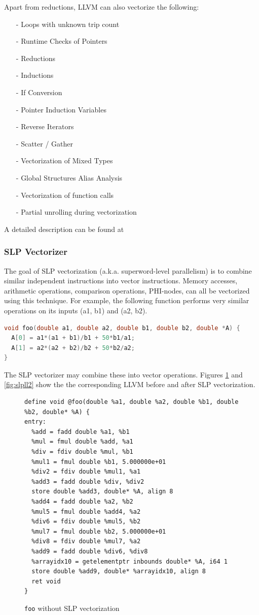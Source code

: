 \documentclass[a4paper,bibliography=totocnumbered,parskip,headsepline]{scrbook}
\begin{document}
Apart from reductions, LLVM can also vectorize the following:
\begin{itemize}[noitemsep]
 \item[-] Loops with unknown trip count
 \item[-] Runtime Checks of Pointers
 \item[-] Reductions
 \item[-] Inductions
 \item[-] If Conversion
 \item[-] Pointer Induction Variables
 \item[-] Reverse Iterators
 \item[-] Scatter / Gather
 \item[-] Vectorization of Mixed Types
 \item[-] Global Structures Alias Analysis
 \item[-] Vectorization of function calls
 \item[-] Partial unrolling during vectorization
\end{itemize}
A detailed description can be found at 

\subsubsection{SLP Vectorizer}
The goal of SLP vectorization (a.k.a. superword-level parallelism) is to combine similar independent instructions into vector instructions.
Memory accesses, arithmetic operations, comparison operations, PHI-nodes, can all be vectorized using this technique.
For example, the following function performs very similar operations on its inputs (a1, b1) and (a2, b2).

\begin{lstlisting}[language=C]
void foo(double a1, double a2, double b1, double b2, double *A) {
  A[0] = a1*(a1 + b1)/b1 + 50*b1/a1;
  A[1] = a2*(a2 + b2)/b2 + 50*b2/a2;
}
\end{lstlisting}

The SLP vectorizer may combine these into vector operations.
Figures \ref{fig:slpll1} and \ref{fig:slpll2} show the the corresponding LLVM before and after SLP vectorization.

\begin{figure}
\begin{lstlisting}
define void @foo(double %a1, double %a2, double %b1, double %b2, double* %A) {
entry:
  %add = fadd double %a1, %b1
  %mul = fmul double %add, %a1
  %div = fdiv double %mul, %b1
  %mul1 = fmul double %b1, 5.000000e+01
  %div2 = fdiv double %mul1, %a1
  %add3 = fadd double %div, %div2
  store double %add3, double* %A, align 8
  %add4 = fadd double %a2, %b2
  %mul5 = fmul double %add4, %a2
  %div6 = fdiv double %mul5, %b2
  %mul7 = fmul double %b2, 5.000000e+01
  %div8 = fdiv double %mul7, %a2
  %add9 = fadd double %div6, %div8
  %arrayidx10 = getelementptr inbounds double* %A, i64 1
  store double %add9, double* %arrayidx10, align 8
  ret void
}
\end{lstlisting}
\caption{\lstinline{foo} without SLP vectorization}
\label{fig:slpll1}
\end{figure}
\end{document}
